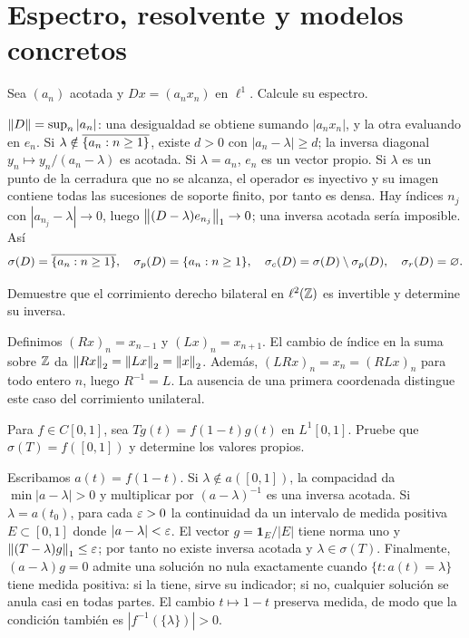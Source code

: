 \chapter{Espectro, resolvente y modelos concretos}

\begin{ejercicio}\label{ej:v3-l07-1}
Sea $(a_n)$ acotada y $Dx=(a_nx_n)$ en $\ell^1$. Calcule su espectro.
\end{ejercicio}
\begin{solucion}
$\left\lVert D\right\rVert=\sup_n|a_n|$: una desigualdad se obtiene sumando $|a_nx_n|$, y la otra evaluando en $e_n$. Si $\lambda\notin\overline{\{a_n:n\ge1\}}$, existe $d>0$ con $|a_n-\lambda|\ge d$; la inversa diagonal $y_n\mapsto y_n/(a_n-\lambda)$ es acotada. Si $\lambda=a_n$, $e_n$ es un vector propio. Si $\lambda$ es un punto de la cerradura que no se alcanza, el operador es inyectivo y su imagen contiene todas las sucesiones de soporte finito, por tanto es densa. Hay índices $n_j$ con $|a_{n_j}-\lambda|\to0$, luego $\left\lVert(D-\lambda)e_{n_j}\right\rVert_1\to0$; una inversa acotada sería imposible. Así
\[\sigma(D)=\overline{\{a_n:n\ge1\}},\quad
\sigma_p(D)=\{a_n:n\ge1\},\quad
\sigma_c(D)=\sigma(D)\setminus\sigma_p(D),\quad\sigma_r(D)=\varnothing.
\]
\end{solucion}

\begin{ejercicio}\label{ej:v3-l07-2}
Demuestre que el corrimiento derecho bilateral en $\ell^2(\mathbb Z)$ es invertible y determine su inversa.
\end{ejercicio}
\begin{solucion}
Definimos $(Rx)_n=x_{n-1}$ y $(Lx)_n=x_{n+1}$. El cambio de índice en la suma sobre $\mathbb Z$ da $\left\lVert Rx\right\rVert_2=\left\lVert Lx\right\rVert_2=\left\lVert x\right\rVert_2$. Además, $(LRx)_n=x_n=(RLx)_n$ para todo entero $n$, luego $R^{-1}=L$. La ausencia de una primera coordenada distingue este caso del corrimiento unilateral.
\end{solucion}

\begin{ejercicio}\label{ej:v3-l07-3}
Para $f\in C[0,1]$, sea $Tg(t)=f(1-t)g(t)$ en $L^1[0,1]$. Pruebe que $\sigma(T)=f([0,1])$ y determine los valores propios.
\end{ejercicio}
\begin{solucion}
Escribamos $a(t)=f(1-t)$. Si $\lambda\notin a([0,1])$, la compacidad da $\min|a-\lambda|>0$ y multiplicar por $(a-\lambda)^{-1}$ es una inversa acotada. Si $\lambda=a(t_0)$, para cada $\varepsilon>0$ la continuidad da un intervalo de medida positiva $E\subset[0,1]$ donde $|a-\lambda|<\varepsilon$. El vector $g=\boldsymbol1_E/|E|$ tiene norma uno y $\left\lVert(T-\lambda)g\right\rVert_1\le\varepsilon$; por tanto no existe inversa acotada y $\lambda\in\sigma(T)$. Finalmente, $(a-\lambda)g=0$ admite una solución no nula exactamente cuando $\{t:a(t)=\lambda\}$ tiene medida positiva: si la tiene, sirve su indicador; si no, cualquier solución se anula casi en todas partes. El cambio $t\mapsto1-t$ preserva medida, de modo que la condición también es $|f^{-1}(\{\lambda\})|>0$.
\end{solucion}

